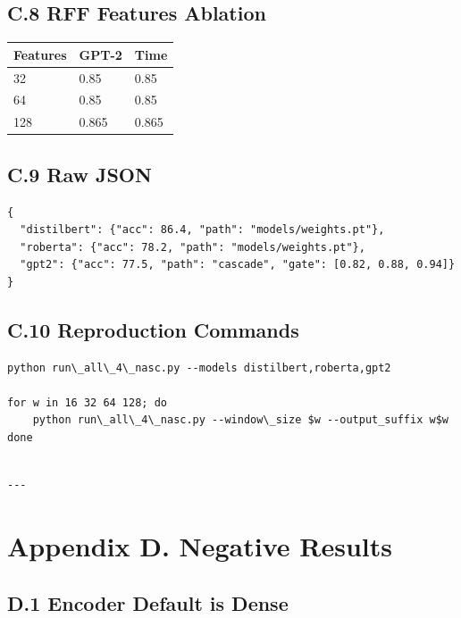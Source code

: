 \subsection{C.8 RFF Features Ablation}

\begin{table}[H]
\centering
\small
\begin{tabular}{lll}
\toprule
\textbf{Features} & \textbf{GPT-2} & \textbf{Time} \\
\midrule
32 & 0.85 & 0.85 \\
64 & 0.85 & 0.85 \\
128 & 0.865 & 0.865 \\
\bottomrule
\end{tabular}
\end{table}

\subsection{C.9 Raw JSON}

\begin{lstlisting}
{
  "distilbert": {"acc": 86.4, "path": "models/weights.pt"},
  "roberta": {"acc": 78.2, "path": "models/weights.pt"},
  "gpt2": {"acc": 77.5, "path": "cascade", "gate": [0.82, 0.88, 0.94]}
}
\end{lstlisting}

\subsection{C.10 Reproduction Commands}

\begin{lstlisting}
python run\_all\_4\_nasc.py --models distilbert,roberta,gpt2

for w in 16 32 64 128; do
    python run\_all\_4\_nasc.py --window\_size $w --output_suffix w$w
done
\end{lstlisting}
\begin{lstlisting}

---
\end{lstlisting}


\section{Appendix D. Negative Results}

\subsection{D.1 Encoder Default is Dense}

